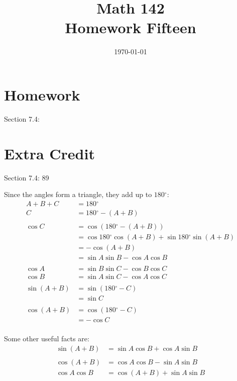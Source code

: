 \documentclass{exam}
\author{}
\date{\today}
\title{Math 142 \\ Homework Fifteen}
\newcommand{\dg}{\ensuremath{^\circ}}
\begin{document}
  \maketitle

  \section{Homework}
  Section 7.4:

  \section{Extra Credit}
  Section 7.4: 89

  \ifprintanswers
    Since the angles form a triangle, they add up to $180 \dg$:
    \begin{align*}
      A + B + C & = 180 \dg \\
      C         & = 180 \dg - (A + B) \\
      \\
      \cos C & = \cos (180 \dg - (A + B)) \\
             & = \cos 180 \dg \cos (A + B) + \sin 180 \dg \sin (A + B) \\
             & = - \cos (A + B) \\
             & = \sin A \sin B - \cos A \cos B \\
             \\
      \cos A &= \sin B \sin C - \cos B \cos C \\
      \cos B &= \sin A \sin C - \cos A \cos C \\
      \\
      \sin (A + B) & = \sin (180 \dg - C) \\
                   & = \sin C \\
      \\
      \cos (A + B) & = \cos (180 \dg - C) \\
                   & = - \cos C \\
    \end{align*}

    Some other useful facts are:
    \begin{align*}
      \sin (A + B) &= \sin A \cos B + \cos A \sin B \\
      \\
      \cos (A + B)  & = \cos A \cos B - \sin A \sin B \\
      \cos A \cos B & = \cos (A + B) + \sin A \sin B \\
    \end{align*}
    
\end{document}
